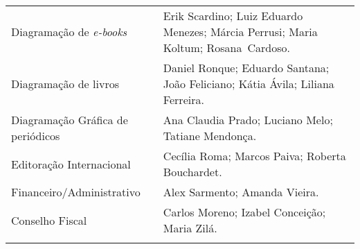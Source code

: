 \documentclass{gescons}
\begin{document}
\begin{longtable}[]{@{}
  >{\raggedright\arraybackslash}p{}
  >{\raggedright\arraybackslash}p{}@{}}
\begin{minipage}[t]{\linewidth}
\end{minipage} \\
\hline
\begin{minipage}[t]{\linewidth}\raggedright
Diagramação de \emph{e-books}
\end{minipage} & \begin{minipage}[t]{\linewidth}\raggedright
Erik Scardino; Luiz Eduardo Menezes; Márcia Perrusi; Maria Koltum; Rosana~Cardoso.
\end{minipage} \\ \addlinespace[4pt]
\hline
\begin{minipage}[t]{\linewidth}\raggedright
Diagramação de livros
\end{minipage} & \begin{minipage}[t]{\linewidth}\raggedright
Daniel Ronque; Eduardo Santana; João Feliciano; Kátia Ávila; Liliana Ferreira.
\end{minipage} \\
\hline
\begin{minipage}[t]{\linewidth}\raggedright
Diagramação Gráfica de periódicos
\end{minipage} & \begin{minipage}[t]{\linewidth}\raggedright
Ana Claudia Prado; Luciano Melo; Tatiane Mendonça.
\end{minipage} \\
\hline
\begin{minipage}[t]{\linewidth}\raggedright
Editoração Internacional
\end{minipage} & \begin{minipage}[t]{\linewidth}\raggedright
Cecília Roma; Marcos Paiva; Roberta Bouchardet.
\end{minipage} \\
\hline
\begin{minipage}[t]{\linewidth}\raggedright
Financeiro/Administrativo
\end{minipage} & \begin{minipage}[t]{\linewidth}\raggedright
Alex Sarmento; Amanda Vieira.
\end{minipage} \\
\hline
\begin{minipage}[t]{\linewidth}\raggedright
Conselho Fiscal
\end{minipage} & \begin{minipage}[t]{\linewidth}\raggedright
Carlos Moreno; Izabel Conceição; Maria Zilá.
\end{minipage} \\
\hline
\begin{minipage}[t]{\linewidth}\raggedright

\end{minipage}
\end{longtable}
\end{document}
